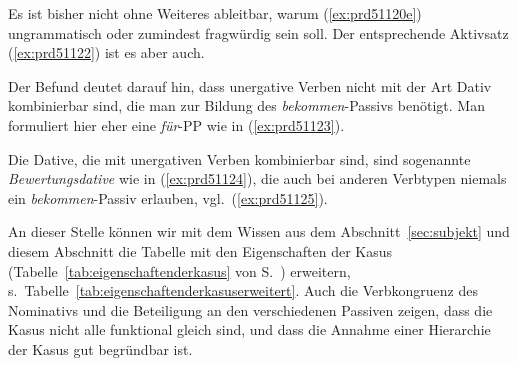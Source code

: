 \begin{exe}
  \ex\label{ex:prd51121} 
  \begin{xlist}
  \end{xlist}
\end{exe}

Es ist bisher nicht ohne Weiteres ableitbar, warum (\ref{ex:prd51120e}) ungrammatisch oder zumindest fragwürdig sein soll.
Der entsprechende Aktivsatz (\ref{ex:prd51122}) ist es aber auch.

\begin{exe}
\end{exe}


Der Befund deutet darauf hin, dass unergative Verben nicht mit der Art Dativ kombinierbar sind, die man zur Bildung des \textit{bekommen}-Passivs benötigt.
Man formuliert hier eher eine \textit{für}-PP wie in (\ref{ex:prd51123}).

\begin{exe}
\end{exe}

Die Dative, die mit unergativen Verben kombinierbar sind, sind sogenannte \textit{Bewertungsdative} wie in (\ref{ex:prd51124}), die auch bei anderen Verbtypen niemals ein \textit{bekommen}-Passiv erlauben, vgl.\ (\ref{ex:prd51125}).

\begin{exe}
  \ex\label{ex:prd51124} 
  \begin{xlist}
  \end{xlist}
  \ex\label{ex:prd51125} 
  \begin{xlist}
  \end{xlist}
\end{exe}

An dieser Stelle können wir mit dem Wissen aus dem Abschnitt~\ref{sec:subjekt} und diesem Abschnitt die Tabelle mit den Eigenschaften der Kasus (Tabelle~\ref{tab:eigenschaftenderkasus} von S.~\pageref{tab:eigenschaftenderkasus}) erweitern, s.\ Tabelle~\ref{tab:eigenschaftenderkasuserweitert}.
Auch die Verbkongruenz des Nominativs und die Beteiligung an den verschiedenen Passiven zeigen, dass die Kasus nicht alle funktional gleich sind, und dass die Annahme einer Hierarchie der Kasus gut begründbar ist.

